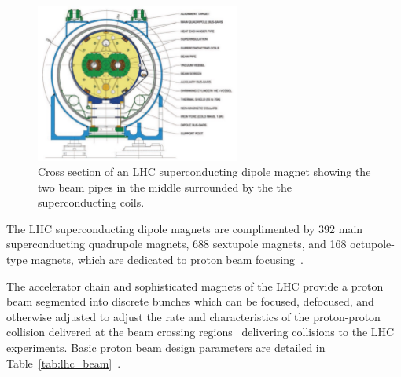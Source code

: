 \begin{figure}[htbp]
\centering
     \includegraphics[width=0.6\textwidth]{cms_and_lhc/plots/lhc_dipole_cross_section.pdf}
     \caption{
Cross section of an LHC superconducting dipole magnet showing the two beam pipes in the middle
surrounded by the the superconducting coils.
     }
     \label{fig:lhc_dipole}
\end{figure}

The LHC superconducting dipole magnets are complimented by 392 main superconducting quadrupole
magnets, 688 sextupole magnets, and 168 octupole-type magnets, which are dedicated to proton 
beam focusing~\cite{lhc_magnets, Voss:2009zz}. 

The accelerator chain and sophisticated magnets of the LHC provide a proton beam segmented
into discrete bunches which can be focused, defocused, and otherwise adjusted to adjust
the rate and characteristics of the proton-proton collision delivered at the beam crossing 
regions~\cite{Benedikt:2004wm} delivering collisions to the LHC experiments. Basic proton 
beam design parameters are detailed in Table~\ref{tab:lhc_beam}~\cite{Benedikt:2004wm}.

